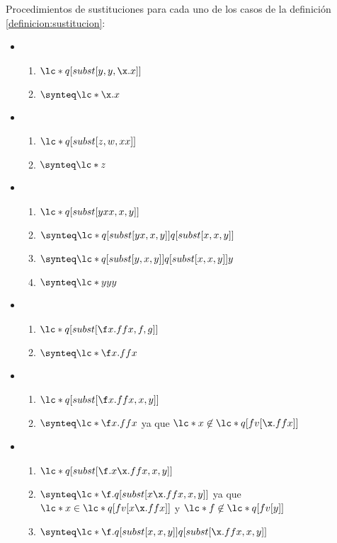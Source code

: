 \begin{ejemplo} Procedimientos de sustituciones para cada uno de los casos de la definición \ref{definicion:sustitucion}: \

  \begin{itemize}
  \item \begin{enumerate}
    \item \(\lc*{q[subst[y,y,\x.x]]}\)
    \item \(\synteq \lc*{\x.x}\)
    \end{enumerate}
  \item \begin{enumerate}
    \item \(\lc*{q[subst[z,w,x x]]}\)
    \item \(\synteq \lc*{z}\)
    \end{enumerate}
  \item \begin{enumerate}
    \item \(\lc*{q[subst[y x x, x, y]]}\)
    \item \(\synteq \lc*{q[subst[y x, x, y]] q[subst[x, x, y]]}\)
    \item \(\synteq \lc*{q[subst[y, x, y]] q[subst[x, x, y]] y}\)
    \item \(\synteq \lc*{y y y}\)
    \end{enumerate}
  \item \begin{enumerate}
    \item \(\lc*{q[subst[\f x.f f x, f, g]]}\)
    \item \(\synteq \lc*{\f x.f f x}\)
    \end{enumerate}
  \item \begin{enumerate}
    \item \(\lc*{q[subst[\f x.f f x, x, y]]}\)
    \item \(\synteq \lc*{\f x.f f x}\) ya que \(\lc*{x} \not\in \lc*{q[fv[\x.f f x]]}\)
    \end{enumerate}
  \item \begin{enumerate}
    \item \(\lc*{q[subst[\f.x\x.f f x, x, y]]}\)
    \item \(\synteq \lc*{\f.q[subst[x\x.f f x, x, y]]}\) ya que \(\lc*{x}\in\lc*{q[fv[x\x.f f x]]}\) y \(\lc*{f}\not\in \lc*{q[fv[y]]}\)
    \item \(\synteq \lc*{\f.q[subst[x,x,y]] q[subst[\x.f f x, x, y]]}\)

\end{enumerate}
\end{itemize}
\end{ejemplo}
